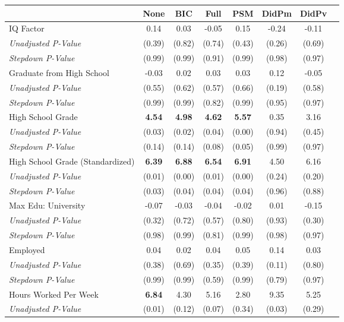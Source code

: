 \begin{tabular}{l c c c c c c c}
\toprule
 & None & BIC & Full & PSM & DidPm & DidPv \\
\midrule
IQ Factor & 0.14 & 0.03 & -0.05 & 0.15 & -0.24 & -0.11 \\
\quad \textit{Unadjusted P-Value} & (0.39) & (0.82) & (0.74) & (0.43) & (0.26) & (0.69) \\
\quad \textit{Stepdown P-Value} & (0.99) & (0.99) & (0.91) & (0.99) & (0.98) & (0.97) \\
Graduate from High School & -0.03 & 0.02 & 0.03 & 0.03 & 0.12 & -0.05 \\
\quad \textit{Unadjusted P-Value} & (0.55) & (0.62) & (0.57) & (0.66) & (0.19) & (0.58) \\
\quad \textit{Stepdown P-Value} & (0.99) & (0.99) & (0.82) & (0.99) & (0.95) & (0.97) \\
High School Grade & \textbf{ 4.54 } & \textbf{ 4.98 } & \textbf{ 4.62 } & \textbf{ 5.57 } & 0.35 & 3.16 \\
\quad \textit{Unadjusted P-Value} & (0.03) & (0.02) & (0.04) & (0.00) & (0.94) & (0.45) \\
\quad \textit{Stepdown P-Value} & (0.14) & (0.14) & (0.08) & (0.05) & (0.99) & (0.97) \\
High School Grade (Standardized) & \textbf{ 6.39 } & \textbf{ 6.88 } & \textbf{ 6.54 } & \textbf{ 6.91 } & 4.50 & 6.16 \\
\quad \textit{Unadjusted P-Value} & (0.01) & (0.00) & (0.01) & (0.00) & (0.24) & (0.20) \\
\quad \textit{Stepdown P-Value} & (0.03) & (0.04) & (0.04) & (0.04) & (0.96) & (0.88) \\
Max Edu: University & -0.07 & -0.03 & -0.04 & -0.02 & 0.01 & -0.15 \\
\quad \textit{Unadjusted P-Value} & (0.32) & (0.72) & (0.57) & (0.80) & (0.93) & (0.30) \\
\quad \textit{Stepdown P-Value} & (0.98) & (0.99) & (0.81) & (0.99) & (0.98) & (0.97) \\
Employed & 0.04 & 0.02 & 0.04 & 0.05 & 0.14 & 0.03 \\
\quad \textit{Unadjusted P-Value} & (0.38) & (0.69) & (0.35) & (0.39) & (0.11) & (0.80) \\
\quad \textit{Stepdown P-Value} & (0.99) & (0.99) & (0.59) & (0.99) & (0.79) & (0.97) \\
Hours Worked Per Week & \textbf{ 6.84 } & 4.30 & 5.16 & 2.80 & 9.35 & 5.25 \\
\quad \textit{Unadjusted P-Value} & (0.01) & (0.12) & (0.07) & (0.34) & (0.03) & (0.29) \\

\end{tabular}
